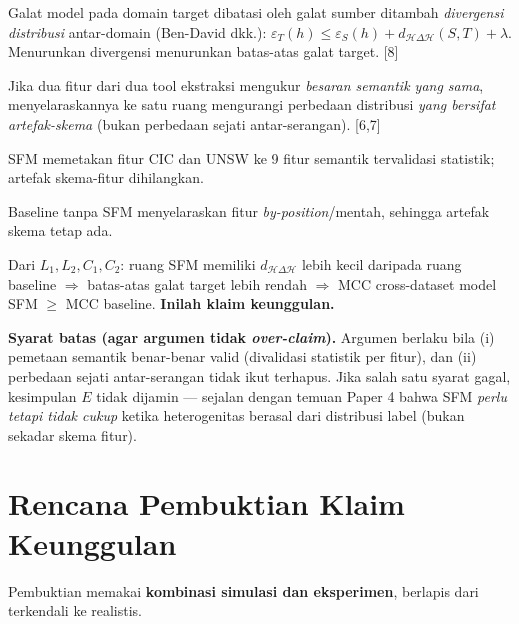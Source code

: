 \documentclass[11pt,a4paper]{article}
\begin{document}
\begin{description}[leftmargin=2.2em,font=\normalfont\itshape]
  \item[Hukum umum $L_1$ (teori adaptasi domain).] Galat model pada domain
  target dibatasi oleh galat sumber ditambah \emph{divergensi distribusi}
  antar-domain (Ben-David dkk.): $\varepsilon_T(h) \le \varepsilon_S(h) +
  d_{\mathcal{H}\Delta\mathcal{H}}(S,T) + \lambda$. Menurunkan divergensi
  menurunkan batas-atas galat target. [8]
  \item[Hukum umum $L_2$ (invariansi semantik).] Jika dua fitur dari dua tool
  ekstraksi mengukur \emph{besaran semantik yang sama}, menyelaraskannya ke satu
  ruang mengurangi perbedaan distribusi \emph{yang bersifat artefak-skema}
  (bukan perbedaan sejati antar-serangan). [6,7]
  \item[Kondisi awal $C_1$.] SFM memetakan fitur CIC dan UNSW ke 9 fitur
  semantik tervalidasi statistik; artefak skema-fitur dihilangkan.
  \item[Kondisi awal $C_2$.] Baseline tanpa SFM menyelaraskan fitur
  \emph{by-position}/mentah, sehingga artefak skema tetap ada.
  \item[Kesimpulan $E$ (deduktif).] Dari $L_1,L_2,C_1,C_2$: ruang SFM memiliki
  $d_{\mathcal{H}\Delta\mathcal{H}}$ lebih kecil daripada ruang baseline
  $\Rightarrow$ batas-atas galat target lebih rendah $\Rightarrow$ MCC
  cross-dataset model SFM $\ge$ MCC baseline. \textbf{Inilah klaim keunggulan.}
\end{description}

\noindent\textbf{Syarat batas (agar argumen tidak \emph{over-claim}).} Argumen
berlaku bila (i) pemetaan semantik benar-benar valid (divalidasi statistik per
fitur), dan (ii) perbedaan sejati antar-serangan tidak ikut terhapus. Jika
salah satu syarat gagal, kesimpulan $E$ tidak dijamin --- sejalan dengan temuan
Paper 4 bahwa SFM \emph{perlu tetapi tidak cukup} ketika heterogenitas berasal
dari distribusi label (bukan sekadar skema fitur).

\section{Rencana Pembuktian Klaim Keunggulan}

Pembuktian memakai \textbf{kombinasi simulasi dan eksperimen}, berlapis dari
terkendali ke realistis.
\end{document}
